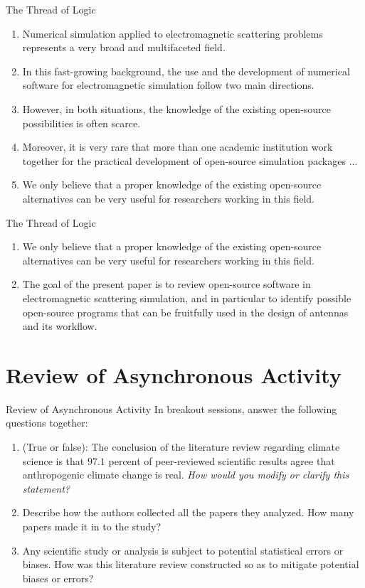 \documentclass{beamer}
\begin{document}
\begin{frame}{The Thread of Logic}
\small
\begin{enumerate}
\item Numerical simulation applied to electromagnetic scattering problems represents a very broad and multifaceted field.
\item In this fast-growing background, the use and the development of numerical software for electromagnetic simulation follow two main directions.
\item However, in both situations, the knowledge of the existing open-source possibilities is often scarce.
\item Moreover, it is very rare that more than one academic institution work together for the practical development of open-source simulation packages ...
\item We only believe that a proper knowledge of the existing open-source alternatives can be very useful for researchers working in this field.
\end{enumerate}
\end{frame}

\begin{frame}{The Thread of Logic}
\small
\begin{enumerate}
\item We only believe that a proper knowledge of the existing open-source alternatives can be very useful for researchers working in this field.
\item The goal of the present paper is to review open-source software in electromagnetic scattering simulation, and in particular to identify possible open-source programs that can be fruitfully used in the design of antennas and its workflow.
\end{enumerate}
\end{frame}

\section{Review of Asynchronous Activity}

\begin{frame}{Review of Asynchronous Activity}
In breakout sessions, answer the following questions together:
\begin{enumerate}
\item (True or false): The conclusion of the literature review regarding climate science is that $97.1$ percent of peer-reviewed scientific results agree that anthropogenic climate change is real.  \textit{How would you modify or clarify this statement?}
\item Describe how the authors collected all the papers they analyzed.  How many papers made it in to the study?
\item Any scientific study or analysis is subject to potential statistical errors or biases.  How was this literature review constructed so as to mitigate potential biases or errors?
\end{enumerate}
\end{frame}
\end{document}
